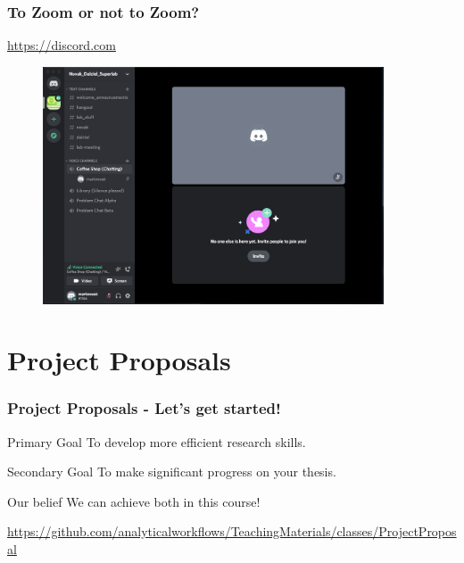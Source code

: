\documentclass{beamer}
\begin{document}

\begin{frame}
    \frametitle{To Zoom or not to Zoom?}
   \url{https://discord.com}
    \begin{figure}
        \centering
        \includegraphics[width = 0.9\textwidth]{figs/Discord.png}
  \end{figure}

\end{frame}


\section{Project Proposals}


\begin{frame}
    \frametitle{Project Proposals - Let's get started!}

    \begin{block}{Primary Goal}
        To develop more efficient research skills.
    \end{block}

    \begin{block}{Secondary Goal}
        To make significant progress on your thesis.
    \end{block}

    \begin{block}{Our belief}
        We can achieve both in this course!
    \end{block}

    \url{https://github.com/analyticalworkflows/TeachingMaterials/classes/ProjectProposal}

\end{frame}
\end{document}
